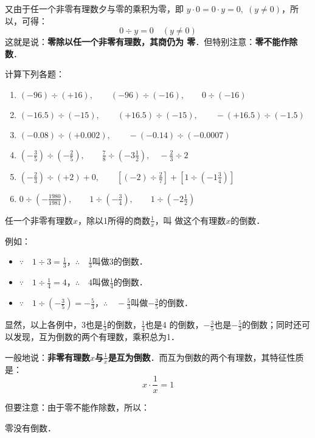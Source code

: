 又由于任一个非零有理数夕与零的乘积为零，即
$y\cdot 0=0\cdot y=0,\; (y\ne 0)$，所以，可得：
\[0\div y=0\quad  (y\ne 0)\]
这就是说：\textbf{零除以任一个非零有理数，其商仍为
	零}．但特别注意：\textbf{零不能作除数}．


\begin{ex}
	计算下列各题：
	\begin{enumerate}
		\item $(-96)\div (+16),\qquad (-96)\div (-16),\qquad 0\div (-16)$
		\item $(-16.5)\div (-15),\qquad (+16.5)\div (-15),\qquad -(+16.5)\div (-1.5)$
		\item $(-0.08)\div(+0.002),\qquad -(-0.14)\div (-0.0007)$
		\item $\left(-\frac{3}{5}\right)\div \left(-\frac{2}{5}\right),\qquad \frac{7}{8}\div \left(-3\frac{1}{2}\right),\quad -\frac{2}{3}\div 2$
		\item $\left(-\frac{2}{3}\right)\div (+2) +0,\qquad \left[(-2)\div \frac{2}{7}\right]+\left[1\div\left(-1\frac{3}{4}\right)\right]$
		\item $0\div \left(-\frac{1980}{1981}\right),\qquad 1\div\left(-\frac{3}{4}\right),\qquad 1\div\left(-2\frac{1}{2}\right)$
	\end{enumerate}
\end{ex}

\begin{blk}{}
	任一个非零有理数$x$，除以1所得的商数$\frac{1}{x}$，叫
	做这个有理数$x$的倒数．
\end{blk}

例如：
\begin{itemize}
	\item $\because\quad 1\div 3=\frac{1}{3}$，\qquad $\therefore\quad \frac{1}{3}$叫做3的倒数．
	\item $\because\quad 1\div \frac{1}{4}=4$，\qquad $\therefore\quad 4$叫做$\frac{1}{4}$的倒数．
	\item $\because\quad 1\div \left(-\frac{3}{5}\right)=-\frac{5}{3}$，\qquad  $\therefore\quad -\frac{5}{3}$叫做$-\frac{3}{5}$的倒数．
\end{itemize}

显然，以上各例中，3也是$\frac{1}{3}$的倒数，$\frac{1}{4}$也是4
的倒数，$-\frac{3}{5}$也是$-\frac{5}{3}$的倒数；同时还可以发现，互为倒数的两个有理数，乘积总为1．

一般地说：\textbf{非零有理数$x$与$\frac{1}{x}$是互为倒数}．而互为倒数的两个有理数，其特征性质是：
\[x\cdot \frac{1}{x}=1\]

但要注意：由于零不能作除数，所以：
\begin{blk}{}
	零没有倒数．
\end{blk}

